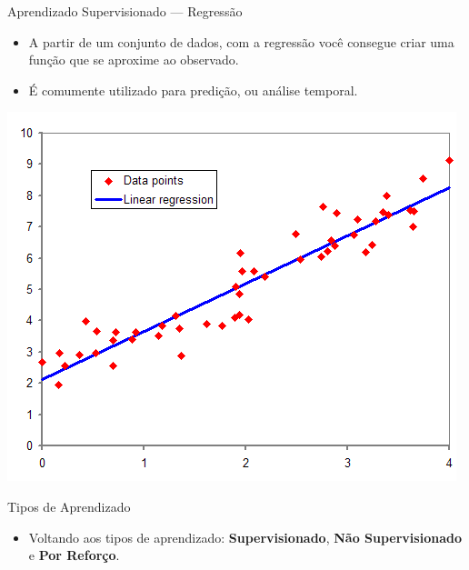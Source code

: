\documentclass{libs/ufc_format}
\begin{document}
\begin{frame}{Aprendizado Supervisionado  --- Regressão}
    \begin{itemize}
        \justifying
        \item A partir de um conjunto de dados, com a regressão você consegue criar uma função que se aproxime ao observado.
        \item É comumente utilizado para predição, ou análise temporal.
    \end{itemize}
    \centering
    \includegraphics[scale = 0.45]{media/normdist_regression}
\end{frame}

\begin{frame}{Tipos de Aprendizado}
    \begin{itemize}
        \justifying
        \item Voltando aos tipos de aprendizado: \textbf{Supervisionado}, \alert{\textbf{Não Supervisionado}} e \textbf{Por Reforço}.
    \end{itemize}
\end{frame}
\end{document}
